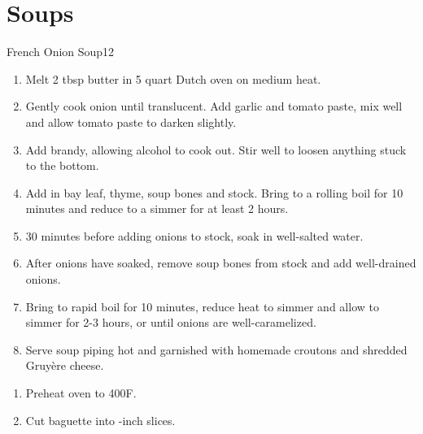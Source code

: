 \chapter{Soups}
\label{cha:soups}

\begin{recipe}{French Onion Soup}{}{12}
  \begin{ingredients}
  \end{ingredients}
  \begin{enumerate}
  \item Melt 2 tbsp butter in 5 quart Dutch oven on medium heat.
  \item Gently cook onion until translucent.  Add garlic and tomato
    paste, mix well and allow tomato paste to darken slightly.
  \item Add brandy, allowing alcohol to cook out.  Stir well to loosen
    anything stuck to the bottom.
  \item Add in bay leaf, thyme, soup bones and stock.  Bring to a
    rolling boil for 10 minutes and reduce to a simmer for at least 2
    hours.
  \item 30 minutes before adding onions to stock, soak in well-salted
    water.
  \item After onions have soaked, remove soup bones from stock and add
    well-drained onions.
  \item Bring to rapid boil for 10 minutes, reduce heat to simmer and
    allow to simmer for 2-3 hours, or until onions are
    well-caramelized.
  \item Serve soup piping hot and garnished with homemade croutons and
    shredded Gruy\`ere cheese.
  \end{enumerate}
  \begin{enumerate}
  \item Preheat oven to 400F.
  \item Cut baguette into \half-inch slices.

\end{enumerate}
\end{recipe}
